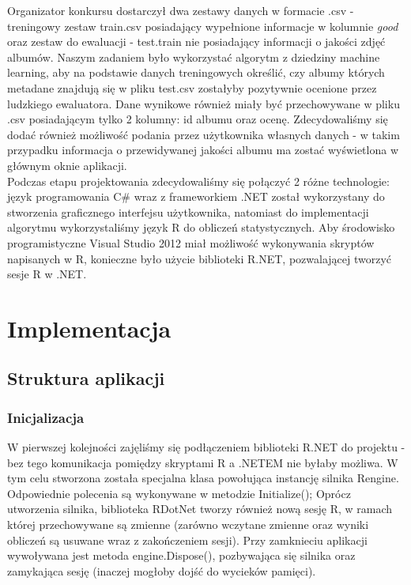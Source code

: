 \documentclass[a4paper,twoside]{article}
\begin{document}
Organizator konkursu dostarczył dwa zestawy danych w formacie .csv - treningowy zestaw train.csv posiadający wypełnione informacje w kolumnie \textit{good} oraz zestaw do ewaluacji - test.train nie posiadający informacji o jakości zdjęć albumów.
Naszym zadaniem było wykorzystać algorytm z dziedziny machine learning, aby na podstawie danych treningowych określić, czy albumy których metadane znajdują się w pliku test.csv zostałyby pozytywnie ocenione przez ludzkiego ewaluatora. Dane wynikowe również miały być przechowywane w pliku .csv posiadającym tylko 2 kolumny: id albumu oraz ocenę. Zdecydowaliśmy się dodać również możliwość podania przez użytkownika własnych danych - w takim przypadku informacja o przewidywanej jakości albumu ma zostać wyświetlona w głównym oknie aplikacji. \\

Podczas etapu projektowania zdecydowaliśmy się połączyć 2 różne technologie: język programowania C\# wraz z frameworkiem .NET został wykorzystany do stworzenia graficznego interfejsu użytkownika, natomiast do implementacji algorytmu wykorzystaliśmy język R do obliczeń statystycznych. Aby środowisko programistyczne Visual Studio 2012 miał możliwość wykonywania skryptów napisanych w R, konieczne było użycie biblioteki R.NET, pozwalającej tworzyć sesje R w .NET.

\section{Implementacja}

\subsection{Struktura aplikacji}

\subsubsection{Inicjalizacja}

W pierwszej kolejności zajęliśmy się podłączeniem biblioteki R.NET do projektu - bez tego komunikacja pomiędzy skryptami R a .NETEM nie byłaby możliwa. W tym celu stworzona została specjalna klasa powołująca instancję silnika Rengine. Odpowiednie polecenia są wykonywane w metodzie Initialize(); Oprócz utworzenia silnika, biblioteka RDotNet tworzy również nową sesję R, w ramach której przechowywane są zmienne (zarówno wczytane zmienne oraz wyniki obliczeń są usuwane wraz z zakończeniem sesji). Przy zamknieciu aplikacji wywoływana jest metoda engine.Dispose(), pozbywająca się silnika oraz zamykająca sesję (inaczej mogłoby dojść do wycieków pamięci). \\
\end{document}
